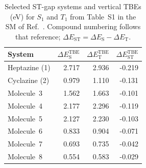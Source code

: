 \begin{table}[htbp]
\centering
\caption{Selected ST-gap systems and vertical TBEs (eV) for $S_1$ and $T_1$ from Table~S1 in the SM of Ref.~. Compound numbering follows that reference; $\Delta E_{\mathrm{ST}}=\Delta E_{\mathrm{S}}-\Delta E_{\mathrm{T}}$.}
\label{tab:si_states_st_gap}
\small
\setlength{\tabcolsep}{6pt}
\begin{tabular}{@{}lrrr@{}}
\hline
System & $\Delta E_{\mathrm{S}}^{\mathrm{TBE}}$ & $\Delta E_{\mathrm{T}}^{\mathrm{TBE}}$ & $\Delta E_{\mathrm{ST}}^{\mathrm{TBE}}$ \\
\hline
Heptazine (1) & 2.717 & 2.936 & -0.219 \\
Cyclazine (2) & 0.979 & 1.110 & -0.131 \\
Molecule~3 & 1.562 & 1.663 & -0.101 \\
Molecule~4 & 2.177 & 2.296 & -0.119 \\
Molecule~5 & 2.127 & 2.230 & -0.103 \\
Molecule~6 & 0.833 & 0.904 & -0.071 \\
Molecule~7 & 0.693 & 0.735 & -0.042 \\
Molecule~8 & 0.554 & 0.583 & -0.029 \\
\hline\hline
\end{tabular}
\end{table}
